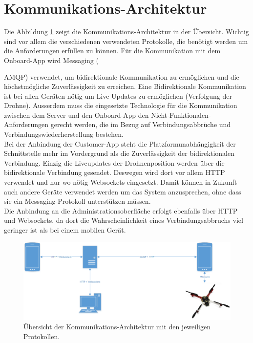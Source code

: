 \section{Kommunikations-Architektur}
Die Abbildung \ref{fig:communication-architecture-overview} zeigt die Kommunikations-Architektur in der Übersicht. Wichtig sind vor allem die verschiedenen verwendeten Protokolle, die benötigt werden um die Anforderungen erfüllen zu können. Für die Kommunikation mit dem Onboard-App wird Messaging ({\Gls{AMQP}) verwendet, um bidirektionale Kommunikation zu ermöglichen und die höchstmögliche Zuverlässigkeit zu erreichen. Eine Bidirektionale Kommunikation ist bei allen Geräten nötig um Live-Updates zu ermöglichen (Verfolgung der Drohne). Ausserdem muss die eingesetzte Technologie für die Kommunikation zwischen dem Server und den Onboard-App den Nicht-Funktionalen-Anforderungen gerecht werden, die im Bezug auf Verbindungsabbrüche und Verbindungswiederherstellung bestehen.\\
	
Bei der Anbindung der Customer-App steht die Platzformunabhängigkeit der Schnittstelle mehr im Vordergrund als die Zuverlässigkeit der bidirektionalen Verbindung. Einzig die Liveupdates der Drohnenposition werden über die bidirektionale Verbindung gesendet. Deswegen wird dort vor allem HTTP verwendet und nur wo nötig Websockets eingesetzt. Damit können in Zukunft auch andere Geräte verwendet werden um das System anzusprechen, ohne dass sie ein Messaging-Protokoll unterstützen müssen.\\

Die Anbindung an die Administrationsoberfläche erfolgt ebenfalls über HTTP und Websockets, da dort die Wahrscheinlichkeit eines Verbindungsabbruchs viel geringer ist als bei einem mobilen Gerät.\\

\begin{figure}[H]
	\includegraphics[width=1.0\textwidth]{images/Communication-Overview-Diagram.png}
	\caption{Übersicht der Kommunikations-Architektur mit den jeweiligen Protokollen. }
	\label{fig:communication-architecture-overview}
\end{figure}

}
